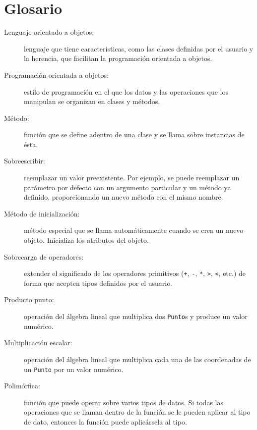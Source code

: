 \section{Glosario}

\begin{description}

\item[Lenguaje orientado a objetos:] lenguaje que tiene 
características,  como las clases definidas por el usuario y la herencia,
que facilitan la programación orientada a objetos.

\item[Programación orientada a objetos:]  estilo de programación en 
el que los datos y las operaciones que los manipulan se organizan en 
clases y métodos.

\item[Método:] función que se define adentro de una clase y se 
llama sobre instancias de ésta.

\item[Sobreescribir:] reemplazar un valor preexistente.  Por ejemplo, se
puede reemplazar un parámetro por defecto con un argumento particular y 
un método ya definido, proporcionando un nuevo método con el mismo nombre.

\item[Método de inicialización:] método especial que se llama automáticamente
cuando se crea un nuevo objeto. Inicializa los atributos del objeto.

\item[Sobrecarga de operadores:] extender el significado de los operadores
primitivos  (\texttt{+}, \texttt{-}, \texttt{*}, \texttt{>}, \texttt{<}, etc.) de
forma que acepten tipos definidos por el usuario.

\item[Producto punto:] operación del álgebra lineal que multiplica dos
 \texttt{Punto}s y produce un valor numérico.

\item[Multiplicación escalar:] operación del álgebra lineal que multiplica
cada una de las coordenadas de un  \texttt{Punto} por un valor numérico.

\item[Polimórfica:] función que puede operar sobre varios tipos de datos.
Si todas las operaciones que se llaman dentro de la función se le pueden 
aplicar al tipo de dato, entonces la función puede aplicársela al tipo.



\end{description}
